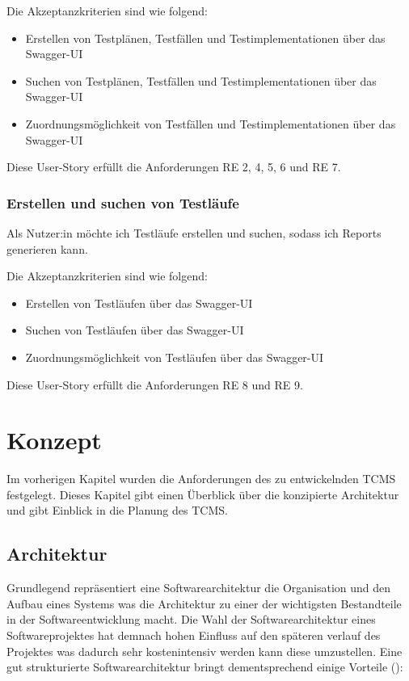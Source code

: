\documentclass[a4paper, fontsize=11pt, parskip=half, twoside]{scrreprt}
\begin{document}
	Die Akzeptanzkriterien sind wie folgend:
	\begin{itemize}
		\item Erstellen von Testplänen, Testfällen und Testimplementationen über das Swagger-UI
		\item Suchen von Testplänen, Testfällen und Testimplementationen über das Swagger-UI
		\item Zuordnungsmöglichkeit von Testfällen und Testimplementationen über das Swagger-UI
	\end{itemize}

	Diese User-Story erfüllt die Anforderungen RE 2, 4, 5, 6 und RE 7.
	
	\subsection{Erstellen und suchen von Testläufe}
	Als Nutzer:in möchte ich Testläufe erstellen und suchen, sodass ich Reports generieren kann.
	
	Die Akzeptanzkriterien sind wie folgend:
	\begin{itemize}
		\item Erstellen von Testläufen über das Swagger-UI
		\item Suchen von Testläufen über das Swagger-UI
		\item Zuordnungsmöglichkeit von Testläufen über das Swagger-UI
	\end{itemize}
	
	Diese User-Story erfüllt die Anforderungen RE 8 und RE 9.
	
	\chapter{Konzept}
	Im vorherigen Kapitel wurden die Anforderungen des zu entwickelnden \ac{TCMS} festgelegt.
	Dieses Kapitel gibt einen Überblick über die konzipierte Architektur und gibt Einblick in die Planung des \ac{TCMS}.
	
	\section{Architektur}
	Grundlegend repräsentiert eine Softwarearchitektur die Organisation und den Aufbau eines Systems was die Architektur zu einer der wichtigsten Bestandteile in der Softwareentwicklung macht.
	Die Wahl der Softwarearchitektur eines Softwareprojektes hat demnach hohen Einfluss auf den späteren verlauf des Projektes was dadurch sehr kostenintensiv werden kann diese umzustellen.
	Eine gut strukturierte Softwarearchitektur bringt dementsprechend einige Vorteile (\textcite{richards_fundamentals_2020}):
	
\end{document}
